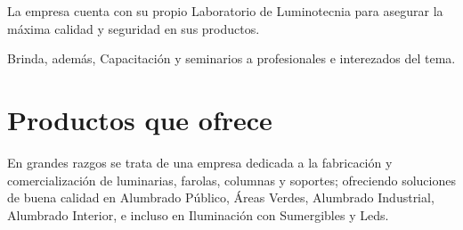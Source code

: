 \documentclass[12pt,titlepage]{report}
\begin{document}
La empresa cuenta con su propio Laboratorio de Luminotecnia para asegurar la m\'axima calidad y seguridad en sus productos.

Brinda, adem\'as, Capacitaci\'on y seminarios a profesionales e interezados del tema.

\section{Productos que ofrece}
En grandes razgos se trata de una empresa dedicada a la fabricaci\'on y comercializaci\'on de luminarias, farolas, columnas y soportes; ofreciendo soluciones de buena calidad en Alumbrado P\'ublico, \'Areas Verdes, Alumbrado Industrial, Alumbrado Interior, e incluso en Iluminaci\'on con Sumergibles y Leds.
\end{document}
